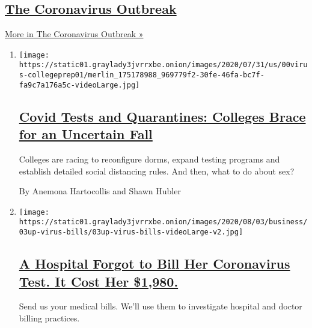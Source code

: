 \hypertarget{the-coronavirus-outbreak}{%
\subsection{\texorpdfstring{\href{/news-event/coronavirus}{The
Coronavirus
Outbreak}}{The Coronavirus Outbreak}}\label{the-coronavirus-outbreak}}

\href{/news-event/coronavirus}{More in The Coronavirus Outbreak »}

\begin{enumerate}
\def\labelenumi{\arabic{enumi}.}
\item
  \texttt{[image: https://static01.graylady3jvrrxbe.onion/images/2020/07/31/us/00virus-collegeprep01/merlin\_175178988\_969779f2-30fe-46fa-bc7f-fa9c7a176a5c-videoLarge.jpg]}

  \hypertarget{covid-tests-and-quarantines-colleges-brace-for-an-uncertain-fall}{%
  \subsection{\texorpdfstring{\href{/2020/08/02/us/covid-college-reopening.html}{Covid
  Tests and Quarantines: Colleges Brace for an Uncertain
  Fall}}{Covid Tests and Quarantines: Colleges Brace for an Uncertain Fall}}\label{covid-tests-and-quarantines-colleges-brace-for-an-uncertain-fall}}

  Colleges are racing to reconfigure dorms, expand testing programs and
  establish detailed social distancing rules. And then, what to do about
  sex?

  By Anemona Hartocollis and Shawn Hubler
\item
  \texttt{[image: https://static01.graylady3jvrrxbe.onion/images/2020/08/03/business/03up-virus-bills/03up-virus-bills-videoLarge-v2.jpg]}

  \hypertarget{a-hospital-forgot-to-bill-her-coronavirus-test-it-cost-her-1980}{%
  \subsection{\texorpdfstring{\href{/2020/08/03/upshot/nj-coronavirus-medical-bill.html}{A
  Hospital Forgot to Bill Her Coronavirus Test. It Cost Her
  \$1,980.}}{A Hospital Forgot to Bill Her Coronavirus Test. It Cost Her \$1,980.}}\label{a-hospital-forgot-to-bill-her-coronavirus-test-it-cost-her-1980}}

  Send us your medical bills. We'll use them to investigate hospital and
  doctor billing practices.


\end{enumerate}
